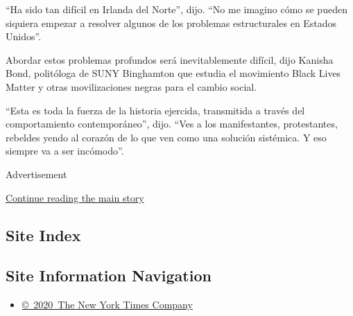 ``Ha sido tan difícil en Irlanda del Norte'', dijo. ``No me imagino cómo
se pueden siquiera empezar a resolver algunos de los problemas
estructurales en Estados Unidos''.

Abordar estos problemas profundos será inevitablemente difícil, dijo
Kanisha Bond, politóloga de SUNY Binghamton que estudia el movimiento
Black Lives Matter y otras movilizaciones negras para el cambio social.

``Esta es toda la fuerza de la historia ejercida, transmitida a través
del comportamiento contemporáneo'', dijo. ``Ves a los manifestantes,
protestantes, rebeldes yendo al corazón de lo que ven como una solución
sistémica. Y eso siempre va a ser incómodo''.

Advertisement

\protect\hyperlink{after-bottom}{Continue reading the main story}

\hypertarget{site-index}{%
\subsection{Site Index}\label{site-index}}

\hypertarget{site-information-navigation}{%
\subsection{Site Information
Navigation}\label{site-information-navigation}}

\begin{itemize}
\tightlist
\item
  \href{https://help.nytimes3xbfgragh.onion/hc/en-us/articles/115014792127-Copyright-notice}{©~2020~The
  New York Times Company}
\end{itemize}

